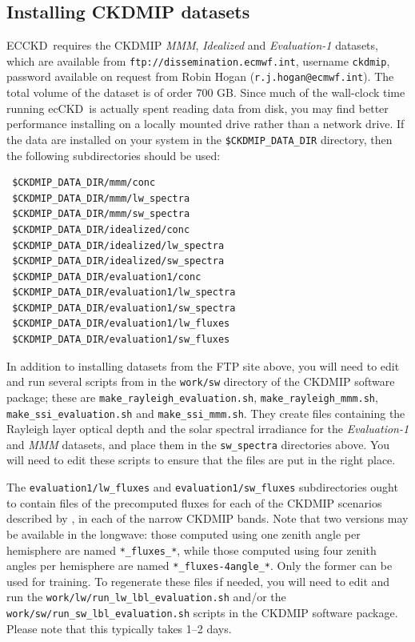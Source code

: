 \documentclass[a4,oneside]{article}
\def\codesize{\small}
\newcommand{\ecckd}{ecCKD}
\newcommand{\Ecckd}{ECCKD}
\def\codesize{\small}
\def\code#1{{\codesize\texttt{#1}}}
\begin{document}
\subsection{Installing CKDMIP datasets}
\label{sec:datasets}
\Ecckd\ requires the CKDMIP \emph{MMM}, \emph{Idealized} and
\emph{Evaluation-1} datasets, which are available from
\code{ftp://dissemination.ecmwf.int}, username \code{ckdmip}, password
available on request from Robin Hogan
(\code{r.j.hogan@ecmwf.int}). The total volume of the dataset is of
order 700 GB. Since much of the wall-clock time running \ecckd\ is
actually spent reading data from disk, you may find better performance
installing on a locally mounted drive rather than a network drive. If
the data are installed on your system in the
\code{\$CKDMIP\_DATA\_DIR} directory, then the following
subdirectories should be used:
\begin{lstlisting}
 $CKDMIP_DATA_DIR/mmm/conc
 $CKDMIP_DATA_DIR/mmm/lw_spectra
 $CKDMIP_DATA_DIR/mmm/sw_spectra
 $CKDMIP_DATA_DIR/idealized/conc
 $CKDMIP_DATA_DIR/idealized/lw_spectra
 $CKDMIP_DATA_DIR/idealized/sw_spectra
 $CKDMIP_DATA_DIR/evaluation1/conc
 $CKDMIP_DATA_DIR/evaluation1/lw_spectra
 $CKDMIP_DATA_DIR/evaluation1/sw_spectra
 $CKDMIP_DATA_DIR/evaluation1/lw_fluxes
 $CKDMIP_DATA_DIR/evaluation1/sw_fluxes
\end{lstlisting}

In addition to installing datasets from the FTP site above, you will
need to edit and run several scripts from in the \code{work/sw}
directory of the CKDMIP software package; these are
\code{make\_rayleigh\_evaluation.sh}, \code{make\_rayleigh\_mmm.sh},
\code{make\_ssi\_evaluation.sh} and \code{make\_ssi\_mmm.sh}. They
create files containing the Rayleigh layer optical depth and the solar
spectral irradiance for the \emph{Evaluation-1} and \emph{MMM}
datasets, and place them in the \code{sw\_spectra} directories
above. You will need to edit these scripts to ensure that the files
are put in the right place.

The \code{evaluation1/lw\_fluxes} and \code{evaluation1/sw\_fluxes}
subdirectories ought to contain files of the precomputed fluxes for
each of the CKDMIP scenarios described by \cite{Hogan&2020}, in each
of the narrow CKDMIP bands. Note that two versions may be available in
the longwave: those computed using one zenith angle per hemisphere are
named \code{*\_fluxes\_*}, while those computed using four zenith
angles per hemisphere are named \code{*\_fluxes-4angle\_*}. Only the
former can be used for training. To regenerate these files if needed,
you will need to edit and run the
\code{work/lw/run\_lw\_lbl\_evaluation.sh} and/or the
\code{work/sw/run\_sw\_lbl\_evaluation.sh} scripts in the CKDMIP
software package. Please note that this typically takes 1--2 days.
\end{document}
